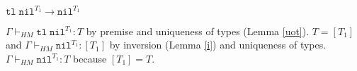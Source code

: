 \begin{case}
$\mathtt{tl}\;\mathtt{nil}^{T_{1}}\rightarrow\mathtt{nil}^{T_{1}}$

$\Gamma\vdash_{HM}\mathtt{tl}\;\mathtt{nil}^{T_{1}}:T$ by premise and uniqueness of types (Lemma \ref{uot}).  $T=[T_{1}]$ and $\Gamma\vdash_{HM}\mathtt{nil}^{T_{1}}:[T_{1}]$ by inversion (Lemma \ref{i}) and uniqueness of types.  $\Gamma\vdash_{HM}\mathtt{nil}^{T_{1}}:T$ because $[T_{1}]=T$.
\end{case}